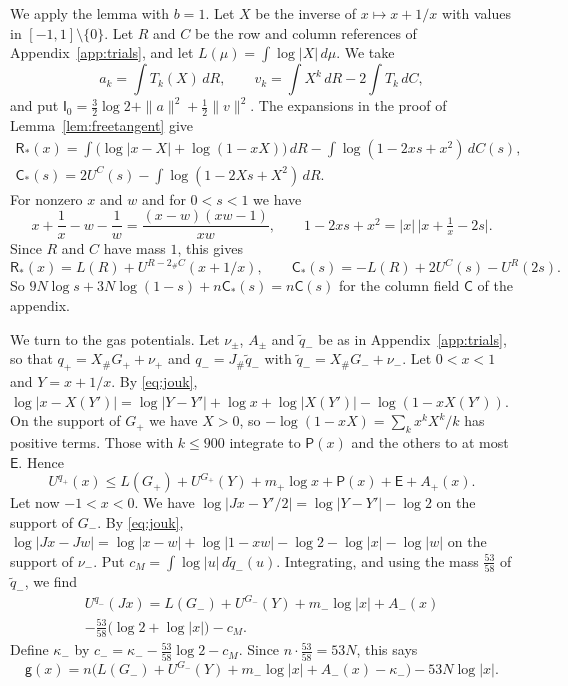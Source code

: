 We apply the lemma with $b=1$. Let $X$ be the inverse of $x\mapsto x+1/x$ with values in $[-1,1]\setminus\{0\}$. Let $R$ and $C$ be the row and column references of Appendix~\ref{app:trials},
and let $L(\mu)=\int\log|X|\,d\mu$. We take
\[
 a_k=\int T_k(X)\,dR,\qquad v_k=\int X^k\,dR-2\int T_k\,dC,
\]
and put $\mathsf I_0=\frac32\log2+\|a\|^2+\frac12\|v\|^2$. The expansions in the proof of Lemma~\ref{lem:freetangent} give
\begin{gather*}
 \mathsf R_*(x)=\int\bigl(\log|x-X|+\log(1-xX)\bigr)\,dR-\int\log(1-2xs+x^2)\,dC(s),\\
 \mathsf C_*(s)=2U^C(s)-\int\log(1-2Xs+X^2)\,dR.
\end{gather*}
For nonzero $x$ and $w$ and for $0<s<1$ we have
\begin{equation}\label{eq:jouk}
 x+\frac1x-w-\frac1w=\frac{(x-w)(xw-1)}{xw},\qquad 1-2xs+x^2=|x|\,\bigl|x+\tfrac1x-2s\bigr|.
\end{equation}
Since $R$ and $C$ have mass $1$, this gives
\[
 \mathsf R_*(x)=L(R)+U^{R-2_\#C}(x+1/x),\qquad \mathsf C_*(s)=-L(R)+2U^C(s)-U^R(2s).
\]
So $9N\log s+3N\log(1-s)+n\mathsf C_*(s)=n\mathsf C(s)$ for the column field $\mathsf C$ of the appendix.

We turn to the gas potentials. Let $\nu_\pm$, $A_\pm$ and $\tilde q_-$ be as in Appendix~\ref{app:trials}, so that $q_+=X_\#G_++\nu_+$ and $q_-=J_\#\tilde q_-$ with $\tilde q_-=X_\#G_-+\nu_-$.
Let $0<x<1$ and $Y=x+1/x$. By \eqref{eq:jouk}, $\log|x-X(Y')|=\log|Y-Y'|+\log x+\log|X(Y')|-\log(1-xX(Y'))$. On the support of $G_+$ we have $X>0$, so
$-\log(1-xX)=\sum_kx^kX^k/k$ has positive terms. Those with $k\le900$ integrate to $\mathsf P(x)$ and the others to at most $\mathsf E$. Hence
\begin{equation}\label{eq:qplus}
 U^{q_+}(x)\le L(G_+)+U^{G_+}(Y)+m_+\log x+\mathsf P(x)+\mathsf E+A_+(x).
\end{equation}
Let now $-1<x<0$. We have $\log|Jx-Y'/2|=\log|Y-Y'|-\log2$ on the support of $G_-$. By \eqref{eq:jouk},
$\log|Jx-Jw|=\log|x-w|+\log|1-xw|-\log2-\log|x|-\log|w|$ on the support of $\nu_-$. Put $c_M=\int\log|u|\,d\tilde q_-(u)$. Integrating, and using the mass $\frac{53}{58}$ of $\tilde q_-$, we find
\begin{multline}\label{eq:qminus}
 U^{q_-}(Jx)=L(G_-)+U^{G_-}(Y)+m_-\log|x|+A_-(x)\\
 -\tfrac{53}{58}\bigl(\log2+\log|x|\bigr)-c_M.
\end{multline}
Define $\kappa_-$ by $c_-=\kappa_--\frac{53}{58}\log2-c_M$. Since $n\cdot\frac{53}{58}=53N$, this says
\begin{equation}\label{eq:gneg}
 \mathsf g(x)=n\bigl(L(G_-)+U^{G_-}(Y)+m_-\log|x|+A_-(x)-\kappa_-\bigr)-53N\log|x|.
\end{equation}

